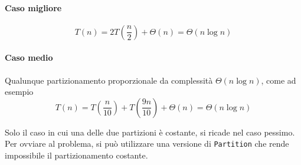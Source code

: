 \paragraph{Caso migliore}
$$T(n) = 2 T\left( \frac{n}{2} \right) + \Theta (n) = \Theta(n \log n)$$

\paragraph{Caso medio} Qualunque partizionamento proporzionale da complessità $\Theta (n \log n)$, come ad esempio
$$T(n) = T \left( \frac{n}{10} \right) + T \left( \frac{9n}{10} \right) + \Theta (n) = \Theta (n \log n)$$

Solo il caso in cui una delle due partizioni è costante, si ricade nel caso pessimo. Per ovviare al
problema, si può utilizzare una versione di \texttt{Partition} che rende impossibile il partizionamento costante.

